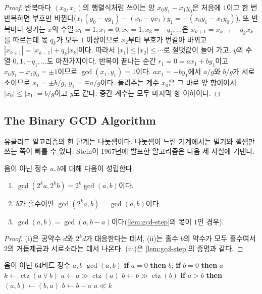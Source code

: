 \begin{proof}
반복마다 $(x_0,x_1)$의 행렬식처럼 쓰이는 양 $x_0y_1-x_1y_0$은 처음에 $1$이고 한 번 반복하면 부호만 바뀐다($x_1(y_0-qy_1)-(x_0-qx_1)y_1=-(x_0y_1-x_1y_0)$). 또 반복마다 생기는 $x$의 수열 $x_0=1,x_1=0,x_2=1,x_3=-q_2,\dots$은 $x_{k+1}=x_{k-1}-q_kx_k$를 따르는데 몫 $q_k$가 모두 $1$ 이상이므로 $x_2$부터 부호가 번갈아 바뀌고 $|x_{k+1}|=|x_{k-1}|+q_k|x_k|$이다. 따라서 $|x_1|\le|x_2|\le\cdots$로 절댓값이 늘어 가고, $y$의 수열 $0,1,-q_1,\dots$도 마찬가지이다. 반복이 끝나는 순간 $r_1=0=ax_1+by_1$이고 $x_0y_1-x_1y_0=\pm1$이므로 $\gcd(x_1,y_1)=1$이다. $ax_1=-by_1$에서 $a/g$와 $b/g$가 서로소이므로 $x_1=\pm b/g$, $y_1=\mp a/g$이다. 돌려주는 계수 $x_0$은 그 바로 앞 항이어서 $|x_0|\le|x_1|=b/g$이고 $y$도 같다. 중간 계수는 모두 마지막 항 이하이다.
\end{proof}

\subsection{The Binary GCD Algorithm}

유클리드 알고리즘의 한 단계는 나눗셈이다. 나눗셈이 느린 기계에서는 밀기와 뺄셈만 쓰는 쪽이 빠를 수 있다. Stein이 1967년에 발표한  알고리즘은 다음 세 사실에 기댄다\cite{stein1967binary}.

\begin{lemma}
\label{lem:binary-gcd}
음이 아닌 정수 $a,b$에 대해 다음이 성립한다.
\begin{enumerate}
\item $\gcd(2^ka,2^kb)=2^k\gcd(a,b)$이다.
\item $b$가 홀수이면 $\gcd(2^ka,b)=\gcd(a,b)$이다.
\item $\gcd(a,b)=\gcd(a,b-a)$이다(\cref{lem:gcd-step}의 몫이 $1$인 경우).
\end{enumerate}
\end{lemma}

\begin{proof}
(i)은 공약수 $d$와 $2^kd$가 대응한다는 데서, (ii)는 홀수 $b$의 약수가 모두 홀수여서 $2$의 거듭제곱과 서로소라는 데서 나온다. (iii)은 \cref{lem:gcd-step}의 증명과 같다.
\end{proof}

\begin{algorithm}[htbp]
\begin{algorithmic}[1]
\Require 음이 아닌 64비트 정수 $a,b$
\Ensure $\gcd(a,b)$
\State \textbf{if} $a=0$ \textbf{then} \Return $b$; \textbf{if} $b=0$ \textbf{then} \Return $a$
\State $k\gets\operatorname{ctz}(a\lor b)$ 
\State $a\gets a\gg\operatorname{ctz}(a)$ 
\Repeat
  \State $b\gets b\gg\operatorname{ctz}(b)$ 
  \State \textbf{if} $a>b$ \textbf{then} $(a,b)\gets(b,a)$
  \State $b\gets b-a$ 
\State \Return $a\ll k$
\end{algorithmic}
\caption{이진 최대공약수 (Stein)}
\label{alg:binary-gcd}
\end{algorithm}

